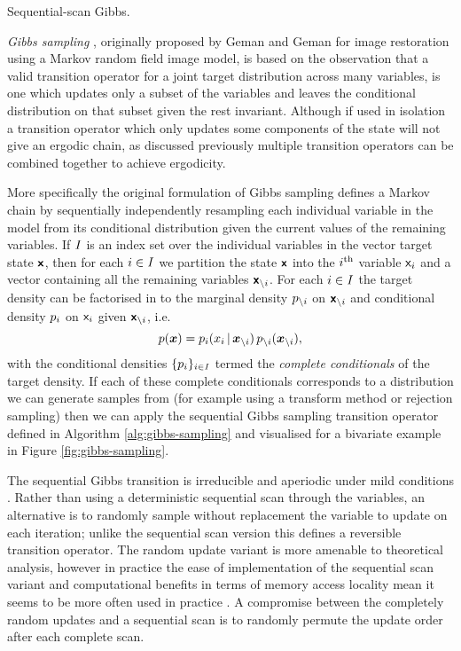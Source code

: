 \begin{algorithm}[!t]
\caption{Sequential-scan Gibbs.}
\label{alg:gibbs-sampling}

\end{algorithm}

\emph{Gibbs sampling} \citep{geman1984stochastic,gelfand1990sampling}, originally proposed by Geman and Geman for image restoration using a Markov random field image model, is based on the observation that a valid transition operator for a joint target distribution across many variables, is one which updates only a subset of the variables and leaves the conditional distribution on that subset given the rest invariant. Although if used in isolation a transition operator which only updates some components of the state will not give an ergodic chain, as discussed previously multiple transition operators can be combined together to achieve ergodicity. 

More specifically the original formulation of Gibbs sampling defines a Markov chain by sequentially independently resampling each individual variable in the model from its conditional distribution given the current values of the remaining variables. If $\mathit{I}$ is an index set over the individual variables in the vector target state $\boldsymbol{\mathsf{x}}$, then for each $i \in \mathit{I}$ we partition the state $\boldsymbol{\mathsf{x}}$ into the $i^{\rm th}$ variable $\mathsf{x}_i$ and a vector containing all the remaining variables $\boldsymbol{\mathsf{x}}_{\backslash i}$. For each $i \in \mathit{I}$ the target density can be factorised in to the marginal density $p_{\backslash i}$ on $\boldsymbol{\mathsf{x}}_{\backslash i}$ and conditional density $p_i$ on $\mathsf{x}_i$ given $\boldsymbol{\mathsf{x}}_{\backslash i}$, i.e.
\begin{equation}\label{eq:gibbs-sampling-complete-conditional-factorisation}
  p(\boldsymbol{x}) = p_{i}(x_i \operatorname{|} \boldsymbol{x}_{\backslash i}) \, p_{\backslash i}(\boldsymbol{x}_{\backslash i}),
\end{equation}
with the conditional densities $\lbrace p_i \rbrace_{i \in \mathit{I}}$ termed the \emph{complete conditionals} of the target density. If each of these complete conditionals corresponds to a distribution we can generate samples from (for example using a transform method or rejection sampling) then we can apply the sequential Gibbs sampling transition operator defined in Algorithm \ref{alg:gibbs-sampling} and visualised for a bivariate example in Figure \ref{fig:gibbs-sampling}.

The sequential Gibbs transition is irreducible and aperiodic under mild conditions \citep{roberts1994simple,chan1993asymptotic}. Rather than using a deterministic sequential scan through the variables, an alternative is to randomly sample without replacement the variable to update on each iteration; unlike the sequential scan version this defines a reversible transition operator. The random update variant is more amenable to theoretical analysis, however in practice the ease of implementation of the sequential scan variant and computational benefits in terms of memory access locality mean it seems to be more often used in practice \citep{he2016scan}. A compromise between the completely random updates and a sequential scan is to randomly permute the update order after each complete scan.

